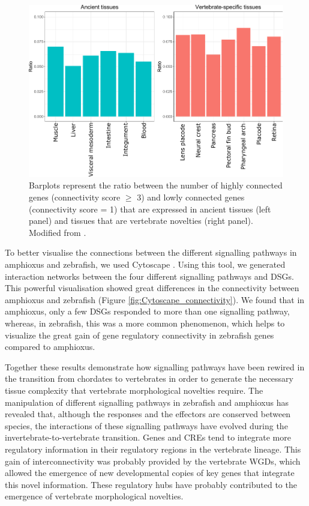 \begin{figure}[h]
\centering
\includegraphics[width=1\textwidth]{Figures/SingleCell_connectivity_ratio}
\caption[Single-cell RNA-seq connectivity ratios]{Barplots represent the ratio between the number of highly connected genes (connectivity score $\geq$ 3) and lowly connected genes (connectivity score = 1) that are expressed in ancient tissues (left panel) and tissues that are vertebrate novelties (right panel). Modified from \parencite{gil-galvez_gain_2022}.}
\label{fig:SingleCell_connectivity_ratio}
\end{figure} 


To better visualise the connections between the different signalling pathways in amphioxus and zebrafish, we used Cytoscape \parencite{shannon_cytoscape_2003}. Using this tool, we generated interaction networks between the four different signalling pathways and DSGs. This powerful visualisation showed great differences in the connectivity between amphioxus and zebrafish (Figure \ref{fig:Cytoscape_connectivity}). We found that in amphioxus, only a few DSGs responded to more than one signalling pathway, whereas, in zebrafish, this was a more common phenomenon, which helps to visualize the great gain of gene regulatory connectivity in zebrafish genes compared to amphioxus.

Together these results demonstrate how signalling pathways have been rewired in the transition from chordates to vertebrates in order to generate the necessary tissue complexity that vertebrate morphological novelties require. The manipulation of different signalling pathways in zebrafish and amphioxus has revealed that, although the responses and the effectors are conserved between species, the interactions of these signalling pathways have evolved during the invertebrate-to-vertebrate transition. Genes and CREs tend to integrate more regulatory information in their regulatory regions in the vertebrate lineage. This gain of interconnectivity was probably provided by the vertebrate WGDs, which allowed the emergence of new developmental copies of key genes that integrate this novel information. These regulatory hubs have probably contributed to the emergence of vertebrate morphological novelties.


